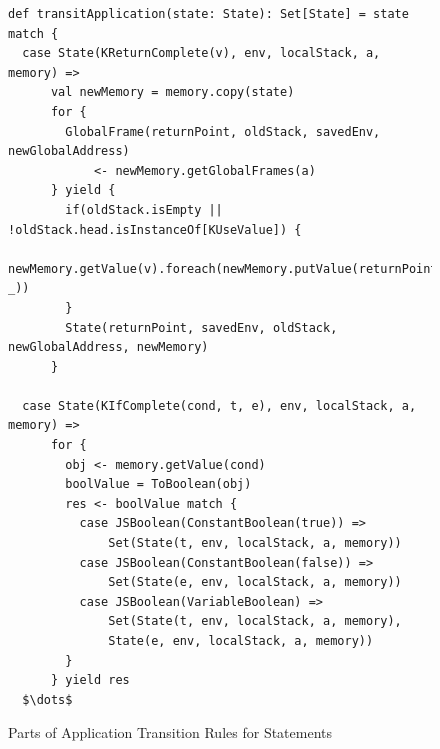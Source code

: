 \documentclass{article}
\begin{document}
\begin{figure}
\lstset{language=Scala, mathescape}
\begin{lstlisting}
def transitApplication(state: State): Set[State] = state match {
  case State(KReturnComplete(v), env, localStack, a, memory) =>
      val newMemory = memory.copy(state)
      for {
        GlobalFrame(returnPoint, oldStack, savedEnv, newGlobalAddress)
            <- newMemory.getGlobalFrames(a)
      } yield {
        if(oldStack.isEmpty || !oldStack.head.isInstanceOf[KUseValue]) {
          newMemory.getValue(v).foreach(newMemory.putValue(returnPoint, _))
        }
        State(returnPoint, savedEnv, oldStack, newGlobalAddress, newMemory)
      }

  case State(KIfComplete(cond, t, e), env, localStack, a, memory) =>
      for {
        obj <- memory.getValue(cond)
        boolValue = ToBoolean(obj)
        res <- boolValue match {
          case JSBoolean(ConstantBoolean(true)) =>
              Set(State(t, env, localStack, a, memory))
          case JSBoolean(ConstantBoolean(false)) =>
              Set(State(e, env, localStack, a, memory))
          case JSBoolean(VariableBoolean) =>
              Set(State(t, env, localStack, a, memory),
              State(e, env, localStack, a, memory))
        }
      } yield res
  $\dots$

\end{lstlisting}
\caption{Parts of Application Transition Rules for Statements}
\label{fig:app-stmt}
\end{figure}
\end{document}
